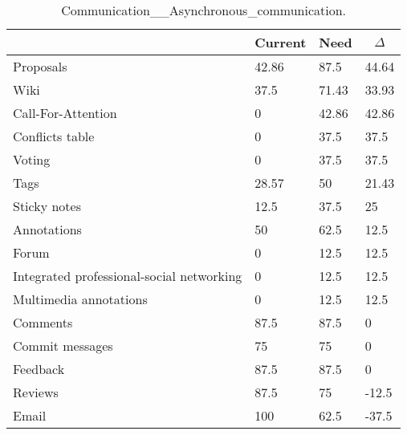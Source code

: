 
  \begin{table*}[]
  \centering
  \notsotiny
  \caption{ Communication__Asynchronous_communication.}
\label{tab:communication__asynchronous_communication}
\begin{tabular}{|l|l|l|l|}
  \hline
  \rowcolor[HTML]{C0C0C0}
    \multicolumn{1}{|c|}{Feature} & \multicolumn{1}{c|}{Current} & \multicolumn{1}{c|}{Need} & \multicolumn{1}{c|}{$\Delta$} \\ \hline
  Proposals & 42.86 & 87.5 & 44.64 \\ \hline 
Wiki & 37.5 & 71.43 & 33.93 \\ \hline 
Call-For-Attention & 0 & 42.86 & 42.86 \\ \hline 
Conflicts table & 0 & 37.5 & 37.5 \\ \hline 
Voting & 0 & 37.5 & 37.5 \\ \hline 
Tags & 28.57 & 50 & 21.43 \\ \hline 
Sticky notes & 12.5 & 37.5 & 25 \\ \hline 
Annotations & 50 & 62.5 & 12.5 \\ \hline 
Forum & 0 & 12.5 & 12.5 \\ \hline 
Integrated professional-social networking & 0 & 12.5 & 12.5 \\ \hline 
Multimedia annotations & 0 & 12.5 & 12.5 \\ \hline 
Comments & 87.5 & 87.5 & 0 \\ \hline 
Commit messages & 75 & 75 & 0 \\ \hline 
Feedback & 87.5 & 87.5 & 0 \\ \hline 
Reviews & 87.5 & 75 & -12.5 \\ \hline 
Email & 100 & 62.5 & -37.5 \\ \hline 
\end{tabular}%
  \end{table*}